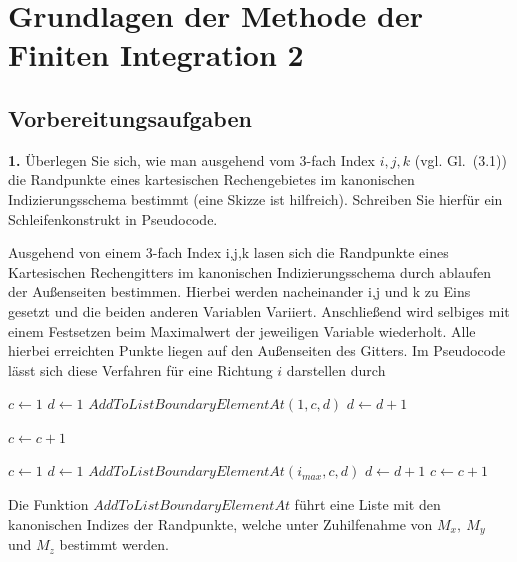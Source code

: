 \documentclass[Protokollheft.tex]{subfiles}
\begin{document}
\chapter{Grundlagen der Methode der Finiten Integration 2}

\section{Vorbereitungsaufgaben}

\begin{framed}
	\noindent \textbf{1.} Überlegen Sie sich, wie man ausgehend vom 3-fach Index $i,j,k$ (vgl. Gl.~(3.1)) die Randpunkte eines kartesischen Rechengebietes im kanonischen Indizierungsschema bestimmt (eine Skizze ist hilfreich). Schreiben Sie hierfür ein Schleifenkonstrukt in Pseudocode.\label{exer:boundIdx}
\end{framed}


Ausgehend von einem 3-fach Index i,j,k lasen sich die Randpunkte eines Kartesischen Rechengitters im kanonischen Indizierungsschema durch ablaufen der Außenseiten bestimmen. Hierbei werden nacheinander i,j und k zu Eins gesetzt und die beiden anderen Variablen Variiert. Anschließend wird selbiges mit einem Festsetzen beim Maximalwert der jeweiligen Variable wiederholt. Alle hierbei erreichten Punkte liegen auf den Außenseiten des Gitters. 
\noindent
Im Pseudocode lässt sich diese Verfahren für eine Richtung $i$ darstellen durch

\begin{algorithmic}[1]
	\STATE $c \leftarrow 1$
	\STATE $d \leftarrow 1$
		\STATE $AddToListBoundaryElementAt(1,c,d)$
		\STATE $d \leftarrow d+1$
	\ENDWHILE
	
	\STATE $c \leftarrow c+1$
	\ENDWHILE
	
	\STATE $c \leftarrow 1$
	\STATE $d \leftarrow 1$
	\STATE $AddToListBoundaryElementAt(i_{max},c,d)$
	\STATE $d \leftarrow d+1$
	\ENDWHILE	
	\STATE	$c \leftarrow c+1$
	\ENDWHILE
	
\end{algorithmic}
\noindent
Die Funktion $AddToListBoundaryElementAt$ führt eine Liste mit den kanonischen Indizes der Randpunkte, welche unter Zuhilfenahme von $M_x,\ M_y$ und $M_z$ bestimmt werden.  
\end{document}
